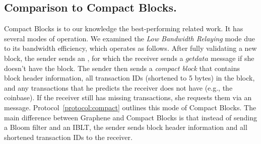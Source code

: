 \subsection{Comparison to Compact Blocks.} 
Compact Blocks\cite{Corallo:2016} is to our knowledge the best-performing related work. It has several modes of operation. 
We examined the  \textit{Low Bandwidth
  Relaying} mode due to its bandwidth efficiency, which operates as follows. 
After fully
validating a new block, the sender sends an \inv, for which the receiver sends a $getdata$ message if she
doesn't have the block. The sender then sends a \textit{compact block}
that contains block header information, all  transaction IDs (shortened to 5 bytes)
in the block, and any transactions that he predicts the receiver does
not have (e.g., the coinbase). If the receiver still has missing transactions, she requests
them via an \inv message. Protocol~\ref{protocol:compact} outlines
this  mode of Compact Blocks. The main difference between Graphene and Compact Blocks is that instead of
sending a Bloom filter and an IBLT, the sender sends block header
information and all shortened transaction IDs to the receiver. 
 
%
%
%
 

